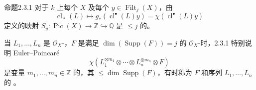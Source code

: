 \begin{SGAresult}{命题}{2.3.1}
对于 $k$ 上每个 $X$ 及每个 $y\in\operatorname{Filt}_j(X)$，由
\[\operatorname{cl}_{\mathrm P}(L)\longmapsto g_*(\operatorname{cl}^\bullet(L)y)=\chi(\operatorname{cl}^\bullet(L)y)\]
定义的映射 $S_y:\operatorname{Pic}(X)\longrightarrow\mathbb Z\hookrightarrow\mathbb Q$ 是 $\leq j$ 的。
\end{SGAresult}
当 $L_1,\ldots,L_n$ 是 $\mathcal O_X$-，$F$ 是满足 $\dim(\operatorname{Supp}(F))=j$ 的 $\mathcal O_X$-时，2.3.1 特别说明 Euler--Poincaré 
\[\chi(L_1^{\otimes m_1}\otimes\cdots\otimes L_n^{\otimes m_n}\otimes F)\tag{2.3.2}\]
是变量 $m_1,\ldots,m_n\in\mathbb Z$ 的，其 $\leq\dim\operatorname{Supp}(F)$，有时称为 $F$ 和序列 $L_1,\ldots,L_n$ 的 。

